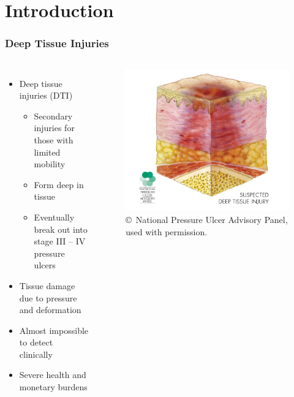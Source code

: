 \documentclass{beamer}
\begin{document}
	\section{Introduction}
		\begin{frame}
			\frametitle{Deep Tissue Injuries}
			\begin{columns}[c]
				\begin{itemize}
					\item Deep tissue injuries (\alert{DTI})
					\begin{itemize}
						\item Secondary injuries for those with limited mobility
						\item Form deep in tissue
						\item Eventually break out into stage III -- IV pressure ulcers
					\end{itemize}
					\item Tissue damage due to \alert{pressure} and \alert{deformation}
					\item Almost impossible to detect clinically
					\item Severe health and monetary burdens
				\end{itemize}

					\begin{figure}
						\centering
						\includegraphics[width=\textwidth]{assets/npuap/suspectedDTI.png}
						\caption{\tiny \copyright\ National Pressure Ulcer Advisory Panel, used with permission.}
					\end{figure}
			\end{columns}
		\end{frame}
\end{document}
